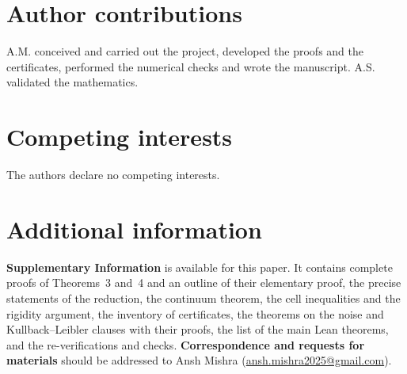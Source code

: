 \documentclass[11pt]{article}
\begin{document}
\section*{Author contributions}
A.M. conceived and carried out the project, developed the proofs and the certificates, performed the numerical checks
and wrote the manuscript. A.S. validated the mathematics.

\section*{Competing interests}
The authors declare no competing interests.

\section*{Additional information}
\textbf{Supplementary Information} is available for this paper. It contains complete proofs of Theorems~3 and~4 and
an outline of their elementary proof, the precise statements of the reduction, the continuum theorem, the cell
inequalities and the rigidity argument, the inventory of certificates, the theorems on the noise and Kullback--Leibler
clauses with their proofs, the list of the main Lean theorems, and the re-verifications and checks.
\textbf{Correspondence and requests for materials} should be addressed to Ansh Mishra
(\href{mailto:ansh.mishra2025@gmail.com}{ansh.mishra2025@gmail.com}).
\end{document}
